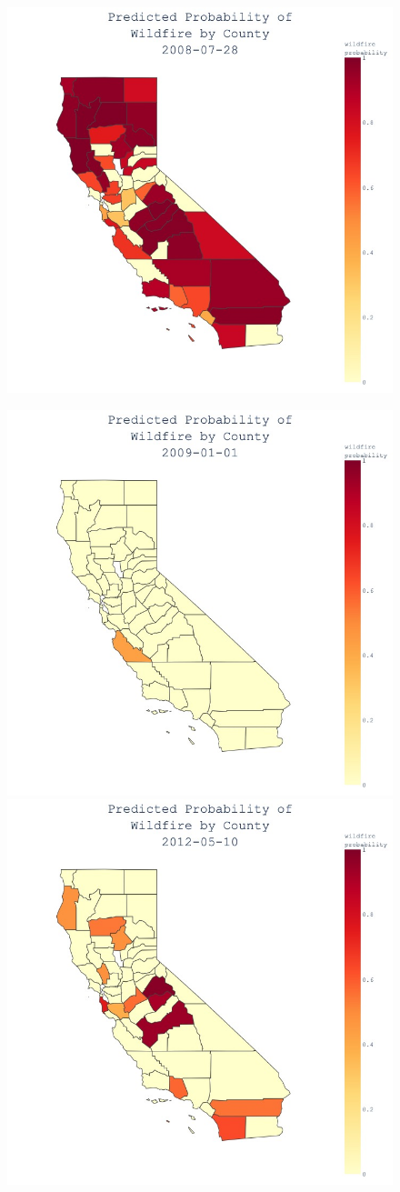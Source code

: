\documentclass{article}
\begin{document}
\begin{figure}[h!]
	\centering
	\includegraphics[width=.75\linewidth]{images/animGraph_0189.jpg}
\end{figure}
\begin{figure}[h!]
	\includegraphics[width=.5\linewidth]{images/animGraph_0346.jpg}
	\includegraphics[width=.5\linewidth]{images/animGraph_1571.jpg}
\end{figure}
\end{document}
